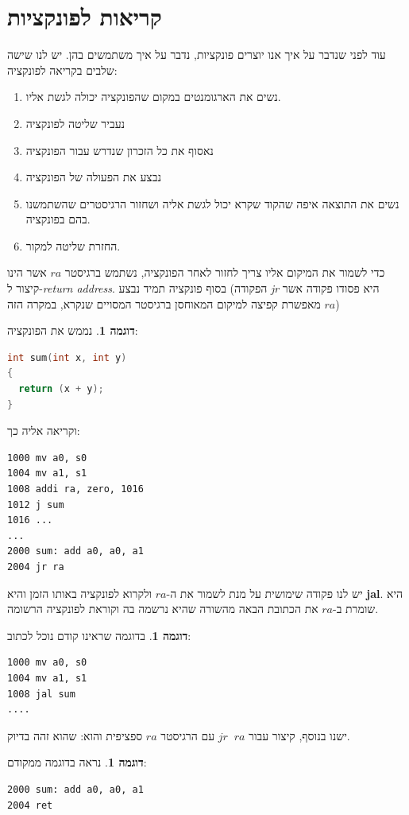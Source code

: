 \documentclass[12pt]{article}
\theoremstyle{plain}
\theoremstyle{definition}
\newtheorem{example}[theorem]{דוגמה}      %
\theoremstyle{remark}
\begin{document}
\part{קריאות לפונקציות}
עוד לפני שנדבר על איך אנו יוצרים פונקציות, נדבר על איך משתמשים בהן.\newline{}
יש לנו שישה שלבים בקריאה לפונקציה:\begin{enumerate}
\item נשים את הארגומנטים במקום שהפונקציה יכולה לגשת אליו.
\item נעביר שליטה לפונקציה
\item נאסוף את כל הזכרון שנדרש עבור הפונקציה
\item נבצע את הפעולה של הפונקציה
\item נשים את התוצאה איפה שהקוד שקרא יכול לגשת אליה ושחזור הרגיסטרים שהשתמשנו בהם בפונקציה.
\item החזרת שליטה למקור.
\end{enumerate}
כדי לשמור את המיקום אליו צריך לחזור לאחר הפונקציה, נשתמש ברגיסטר \({ra}\) אשר הינו קיצור ל-\emph{return address}.\newline{}
בסוף פונקציה תמיד נבצע  (הפקודה \emph{jr} היא פסודו פקודה אשר מאפשרת קפיצה למיקום המאוחסן ברגיסטר המסויים שנקרא, במקרה הזה \({ra}\))\begin{example}
נממש את הפונקציה:\begin{LTR}\begin{lstlisting}[language=c]
int sum(int x, int y)
{
  return (x + y);
}

\end{lstlisting}\end{LTR}וקריאה אליה כך:\begin{LTR}\begin{lstlisting}[language=assembly]
1000 mv a0, s0
1004 mv a1, s1
1008 addi ra, zero, 1016
1012 j sum
1016 ...
...
2000 sum: add a0, a0, a1
2004 jr ra

\end{lstlisting}\end{LTR}
\end{example}
יש לנו פקודה שימושית על מנת לשמור את ה-\({ra}\) ולקרוא לפונקציה באותו הזמן והיא \textbf{jal}. היא שומרת ב-\({ra}\) את הכתובת הבאה מהשורה שהיא נרשמה בה וקוראת לפונקציה הרשומה.\begin{example}
בדוגמה שראינו קודם נוכל לכתוב:\begin{LTR}\begin{lstlisting}[language=assembly]
1000 mv a0, s0
1004 mv a1, s1
1008 jal sum
....

\end{lstlisting}\end{LTR}
\end{example}
ישנו בנוסף, קיצור עבור \({jr\;\; ra}\) עם הרגיסטר \({ra}\) ספציפית והוא:  שהוא זהה בדיוק.\begin{example}
נראה בדוגמה ממקודם:\begin{LTR}\begin{lstlisting}[language=assembly]
2000 sum: add a0, a0, a1
2004 ret

\end{lstlisting}\end{LTR}
\end{example}
\end{document}
